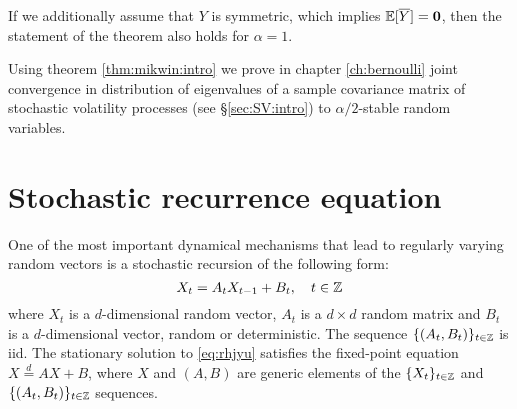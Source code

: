 \begin{remark}\label{rem:case:alpha:1:intro}
If we additionally assume that $Y$ is symmetric, which implies $\mathbb{E}[\overline
  Y]=\mathbf{0}$, then the statement of the theorem also holds for
$\alpha=1$.
\end{remark}

Using theorem \ref{thm:mikwin:intro} we prove in chapter
\ref{ch:bernoulli} joint convergence in distribution of eigenvalues of
a sample covariance matrix of stochastic volatility processes (see
\S\ref{sec:SV:intro}) to $\alpha/2$-stable random variables.


\section{Stochastic recurrence equation}
\label{sec:tyhyjyt}
One of the most important dynamical mechanisms that lead to regularly
varying random vectors is a stochastic recursion of the following form:
\begin{equation}
  \label{eq:rhjyu}
  X_t = A_t X_{t-1} + B_t, \quad t \in \mathbb Z
\end{equation}
where $X_t$ is a $d$-dimensional random vector, $A_t$ is a $d\times d$
random matrix and $B_t$ is a $d$-dimensional vector, random or
deterministic. The sequence $\{(A_t, B_t)\}_{t \in \mathbb Z}$ is
iid. The stationary solution to \eqref{eq:rhjyu} satisfies the fixed-point
equation $X \overset{d}{=} A X + B$, where $X$ and $(A, B)$ are
generic elements of the $\{X_t\}_{t \in \mathbb Z}$ and
$\{(A_t, B_t)\}_{t \in \mathbb Z}$ sequences.

